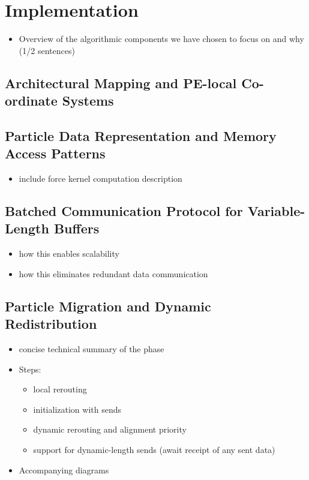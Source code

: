 \documentclass[review, anonymous, acmsmall]{acmart}
\begin{document}
\section{Implementation}
\begin{itemize}
  \item Overview of the algorithmic components we have chosen to focus on and why (1/2 sentences) 
\end{itemize}
\subsection{Architectural Mapping and PE-local Co-ordinate Systems}
\subsection{Particle Data Representation and Memory Access Patterns}
\begin{itemize}
  \item include force kernel computation description
\end{itemize}
\subsection{Batched Communication Protocol for Variable-Length Buffers}
\begin{itemize}
  \item how this enables scalability
  \item how this eliminates redundant data communication
\end{itemize}
\subsection{Particle Migration and Dynamic Redistribution}
\begin{itemize}
  \item concise technical summary of the phase
  \item Steps:
  \begin{itemize}
    \item local rerouting
    \item initialization with sends
    \item dynamic rerouting and alignment priority
    \item support for dynamic-length sends (await receipt of any sent data)
  \end{itemize}
  \item Accompanying diagrams
\end{itemize}
\end{document}
